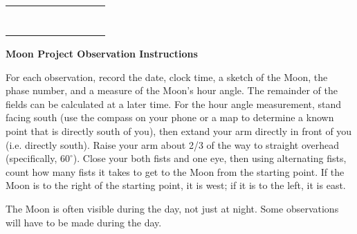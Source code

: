 \documentclass{article}
\newcommand{\tikzcircle}{\begin{tikzpicture}\draw[black, line width=0.25mm] (0.5,0.5) circle (0.5); \end{tikzpicture}}
\begin{document}
\begin{center}
\begin{tabular}{|c|c|c|c|c||c|c|c|c|}
\hline
                               &            & \tikzcircle &        &         &                &      &       &           \\
\hline
                               &            & \tikzcircle &        &         &                &      &       &           \\
\hline
                               &            & \tikzcircle &        &         &                &      &       &           \\
\hline
                               &            & \tikzcircle &        &         &                &      &       &           \\
\hline
                               &            & \tikzcircle &        &         &                &      &       &           \\
\hline
                               &            & \tikzcircle &        &         &                &      &       &           \\
\hline
                               &            & \tikzcircle &        &         &                &      &       &           \\
\hline
                               &            & \tikzcircle &        &         &                &      &       &           \\
\hline
\end{tabular}
\end{center}
\newpage
\begin{center}\textbf{Moon Project Observation Instructions}\end{center}
\vspace{0.5cm}
\noindent For each observation, record the date, clock time, a sketch of the Moon, the phase number, and a measure of the Moon's hour angle. The remainder of the fields can be calculated at a later time. For the hour angle measurement, stand facing south (use the compass on your phone or a map to determine a known point that is directly south of you), then extand your arm directly in front of you (i.e. directly south). Raise your arm about 2/3 of the way to straight overhead (specifically, $60^\circ$). Close your both fists and one eye, then using alternating fists, count how many fists it takes to get to the Moon from the starting point. If the Moon is to the right of the starting point, it is west; if it is to the left, it is east. 

The Moon is often visible during the day, not just at night. Some observations will have to be made during the day.
\end{document}
